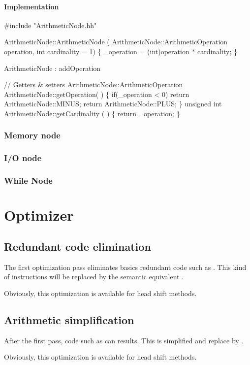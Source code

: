 \paragraph{Implementation}
\nwenddocs{}\endmoddef\nwstartdeflinemarkup\nwenddeflinemarkup
#include "ArithmeticNode.hh"

ArithmeticNode::ArithmeticNode ( ArithmeticNode::ArithmeticOperation operation, int cardinality = 1) \{
        _operation = (int)operation * cardinality;
\}

\LA{}ArithmeticNode : addOperation\RA{}

// Getters & setters
ArithmeticNode::ArithmeticOperation ArithmeticNode::getOperation( ) \{
        if(_operation < 0) return ArithmeticNode::MINUS;
        return ArithmeticNode::PLUS;
\}
unsigned int ArithmeticNode::getCardinality ( ) \{ return _operation; \}
\nwendcode{}\nwdocspar

\subsubsection{Memory node}

\subsubsection{I/O node}

\subsubsection{While Node}
\nwenddocs{}\section{Optimizer}

\subsection{Redundant code elimination\label{RCE}}
The first optimization pass eliminates basics redundant code such as \ttt{+++++}. This kind of instructions will be replaced by the semantic equivalent .

Obviously, this optimization is available for head shift methods.

\subsection{Arithmetic simplification\label{AS}}
After the first pass, code such as  can results. This is simplified and replace by \ttt{-}.

Obviously, this optimization is available for head shift methods.
\nwenddocs{}
